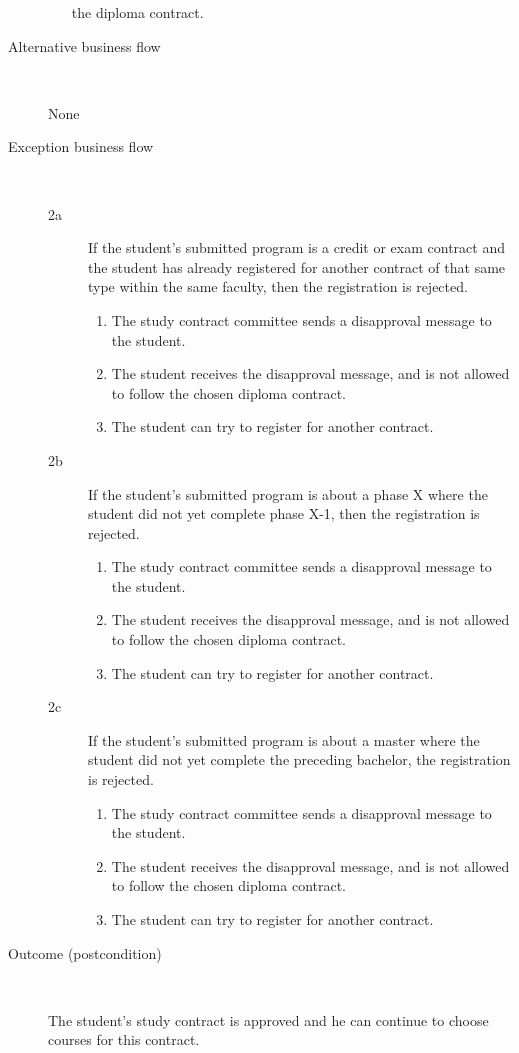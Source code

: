 \begin{description}
\begin{enumerate}
	  	the diploma contract.
	\end{enumerate}
	\item[Alternative business flow] \
		\par None
	\item[Exception business flow] \ 
	\begin{description}
		\item[2a] If the student's submitted program is a credit or exam contract and
		the student has already registered for another contract of that same type
		within the same faculty, then the registration is rejected.
		\begin{enumerate}
		  	\item The study contract committee sends a disapproval message to the
		  	student.
		  	\item The student receives the disapproval message, and is not allowed to
		  	follow the chosen diploma contract.
		  	\item The student can try to register for another contract.
		\end{enumerate}
		\item[2b] If the student's submitted program is about a phase X where the
		student did not yet complete phase X-1, then the registration is rejected.
		\begin{enumerate}
		  	\item The study contract committee sends a disapproval message to the
		  	student.
		  	\item The student receives the disapproval message, and is not allowed to
		  	follow the chosen diploma contract.
		  	\item The student can try to register for another contract.
		\end{enumerate}
		\item[2c] If the student's submitted program is about a master where the
		student did not yet complete the preceding bachelor, the registration is
		rejected.
		\begin{enumerate}
		  	\item The study contract committee sends a disapproval message to the
		  	student.
		  	\item The student receives the disapproval message, and is not allowed to
		  	follow the chosen diploma contract.
		  	\item The student can try to register for another contract.
		\end{enumerate}
	\end{description}
	\item[Outcome (postcondition)] \ 
		\par The student's study contract is approved and he can continue to choose
		courses for this contract.
\end{description}

